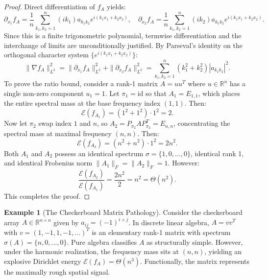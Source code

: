 \documentclass[11pt,a4paper,reqno]{amsart}
\theoremstyle{definition}
\newtheorem{example}[theorem]{Example}
\numberwithin{equation}{section}
\newcommand{\R}{\mathbb{R}}
\begin{document}
\begin{proof}
Direct differentiation of $f_A$ yields:
\begin{equation}
    \partial_{x_1} f_A = \frac{1}{n} \sum_{k_1, k_2=1}^n (i k_1) a_{k_1 k_2} e^{i(k_1 x_1 + k_2 x_2)}, \quad
    \partial_{x_2} f_A = \frac{1}{n} \sum_{k_1, k_2=1}^n (i k_2) a_{k_1 k_2} e^{i(k_1 x_1 + k_2 x_2)}.
\end{equation}
Since this is a finite trigonometric polynomial, termwise differentiation and the interchange of limits are unconditionally justified. By Parseval's identity on the orthogonal character system $\{e^{i(k_1 x_1 + k_2 x_2)}\}$:
\begin{equation}
    \|\nabla f_A\|_{L^2}^2 = \|\partial_{x_1} f_A\|_{L^2}^2 + \|\partial_{x_2} f_A\|_{L^2}^2 = \sum_{k_1, k_2=1}^n (k_1^2 + k_2^2) |a_{k_1 k_2}|^2.
\end{equation}
To prove the ratio bound, consider a rank-1 matrix $A = u u^T$ where $u \in \R^n$ has a single non-zero component $u_1 = 1$. Let $\pi_1 = \mathrm{id}$ so that $A_1 = E_{1,1}$, which places the entire spectral mass at the base frequency index $(1, 1)$. Then:
\begin{equation}
    \mathcal{E}(f_{A_1}) = (1^2 + 1^2) \cdot 1^2 = 2.
\end{equation}
Now let $\pi_2$ swap index $1$ and $n$, so $A_2 = P_{\pi_2} A P_{\pi_2}^T = E_{n, n}$, concentrating the spectral mass at maximal frequency $(n, n)$. Then:
\begin{equation}
    \mathcal{E}(f_{A_2}) = (n^2 + n^2) \cdot 1^2 = 2n^2.
\end{equation}
Both $A_1$ and $A_2$ possess an identical spectrum $\sigma = \{1, 0, \dots, 0\}$, identical rank 1, and identical Frobenius norm $\|A_1\|_F = \|A_2\|_F = 1$. However:
\begin{equation}
    \frac{\mathcal{E}(f_{A_2})}{\mathcal{E}(f_{A_1})} = \frac{2n^2}{2} = n^2 = \Theta(n^2).
\end{equation}
This completes the proof.
\end{proof}

\begin{example}[The Checkerboard Matrix Pathology]
Consider the checkerboard array $A \in \R^{n \times n}$ given by $a_{ij} = (-1)^{i+j}$. In discrete linear algebra, $A = v v^T$ with $v = (1, -1, 1, -1, \dots)^T$ is an elementary rank-1 matrix with spectrum $\sigma(A) = \{n, 0, \dots, 0\}$. Pure algebra classifies $A$ as structurally simple. However, under the harmonic realization, the frequency mass sits at $(n, n)$, yielding an explosive Dirichlet energy $\mathcal{E}(f_A) = \Theta(n^3)$. Functionally, the matrix represents the maximally rough spatial signal.
\end{example}
\end{document}
